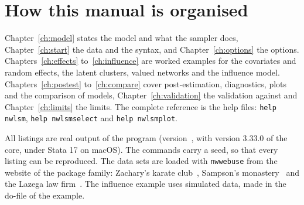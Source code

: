 \section{How this manual is organised}

Chapter~\ref{ch:model} states the model and what the sampler does, Chapter~\ref{ch:start} the data and the syntax, and Chapter~\ref{ch:options} the options. Chapters~\ref{ch:effects} to~\ref{ch:influence} are worked examples for the covariates and random effects, the latent clusters, valued networks and the influence model. Chapters~\ref{ch:postest} to~\ref{ch:compare} cover post-estimation, diagnostics, plots and the comparison of models, Chapter~\ref{ch:validation} the validation against \latentnet{} and Chapter~\ref{ch:limits} the limits. The complete reference is the help files: \texttt{help nwlsm}, \texttt{help nwlsmselect} and \texttt{help nwlsmplot}.

All listings are real output of the program (version~\pkgversion{}, with version 3.33.0 of the core, under Stata 17 on macOS). The commands carry a seed, so that every listing can be reproduced. The data sets are loaded with \texttt{nwwebuse} from the website of the package family: Zachary's karate club~\cite{zachary1977}, Sampson's monastery~\cite{sampson1969} and the Lazega law firm~\cite{lazega2001}. The influence example uses simulated data, made in the do-file of the example.
